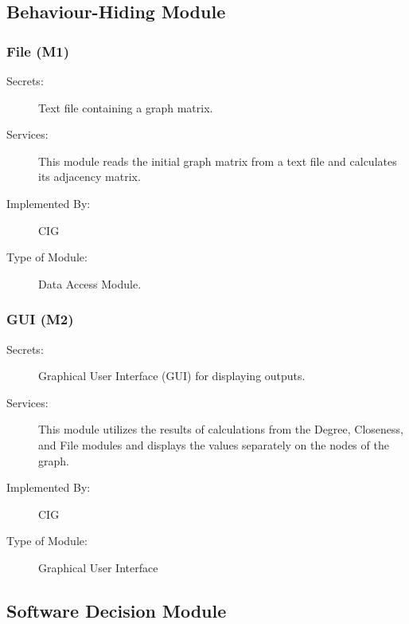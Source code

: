 \documentclass[12pt, titlepage]{article}
\begin{document}
\subsection{Behaviour-Hiding Module}



\subsubsection{File (M1)}

\begin{description}
\item[Secrets:] Text file containing a graph matrix.
\item[Services:] This module reads the initial graph matrix from a text file and calculates its adjacency matrix.
\item[Implemented By:] CIG
\item[Type of Module:] Data Access Module.
\end{description}

\subsubsection{GUI (M2)}
\begin{description}
\item[Secrets:] Graphical User Interface (GUI) for displaying outputs.
\item[Services:] This module utilizes the results of calculations from the Degree, Closeness, and File modules and displays the values separately on the nodes of the graph.
\item[Implemented By:] CIG
\item[Type of Module:] Graphical User Interface
\end{description}


\subsection{Software Decision Module}
\end{document}
